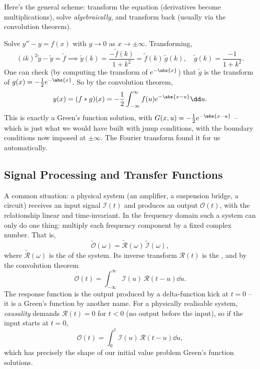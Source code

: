Here's the general scheme: transform the equation (derivatives become multiplications), solve \emph{algebraically}, and transform back (usually via the convolution theorem).

\begin{example}
    Solve $y'' - y = f(x)$ with $y \to 0$ as $x \to \pm\infty$. Transforming,
    $$
    (ik)^2 \tilde{y} - \tilde{y} = \tilde{f} \implies \tilde{y}(k) = \frac{-\tilde{f}(k)}{1 + k^2} = \tilde{f}(k)\, \tilde{g}(k), \quad \tilde{g}(k) = \frac{-1}{1 + k^2}.
    $$
    One can check (by computing the transform of $e^{-\abs{x}}$) that $\tilde{g}$ is the transform of $g(x) = -\frac{1}{2}e^{-\abs{x}}$. So by the convolution theorem,
    $$
    y(x) = (f * g)(x) = -\frac{1}{2}\int_{-\infty}^{\infty} f(u) e^{-\abs{x - u}} \dd u.
    $$
    This is exactly a Green's function solution, with $G(x, u) = -\frac{1}{2}e^{-\abs{x - u}}$ -- which is just what we would have built with jump conditions, with the boundary conditions now imposed at $\pm \infty$. The Fourier transform found it for us automatically.
\end{example}

\subsection{Signal Processing and Transfer Functions}

A common situation: a physical system (an amplifier, a suspension bridge, a circuit) receives an input signal $\mathcal{I}(t)$ and produces an output $\mathcal{O}(t)$, with the relationship linear and time-invariant. In the frequency domain such a system can only do one thing: multiply each frequency component by a fixed complex number. That is,
$$
\tilde{\mathcal{O}}(\omega) = \tilde{\mathcal{R}}(\omega)\, \tilde{\mathcal{I}}(\omega),
$$
where $\tilde{\mathcal{R}}(\omega)$ is the  of the system. Its inverse transform $\mathcal{R}(t)$ is the , and by the convolution theorem
$$
\mathcal{O}(t) = \int_{-\infty}^{\infty} \mathcal{I}(u)\, \mathcal{R}(t - u) \dd u.
$$
The response function is the output produced by a delta-function kick at $t = 0$ -- it is a Green's function by another name. For a physically realisable system, \emph{causality} demands $\mathcal{R}(t) = 0$ for $t < 0$ (no output before the input), so if the input starts at $t = 0$,
$$
\mathcal{O}(t) = \int_0^t \mathcal{I}(u)\, \mathcal{R}(t - u) \dd u,
$$
which has precisely the shape of our initial value problem Green's function solutions.

